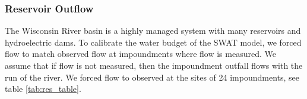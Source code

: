 \subsubsection{Reservoir Outflow}
The Wisconsin River basin is a highly managed system with many reservoirs and hydroelectric dams. To calibrate the water budget of the SWAT model, we forced flow to match observed flow at impoundments where flow is measured. We assume that if flow is not measured, then the impoundment outfall flows with the run of the river. We forced flow to observed at the sites of 24 impoundments, see table \ref{tab:res_table}.
\begin{landscape}

\end{landscape}



